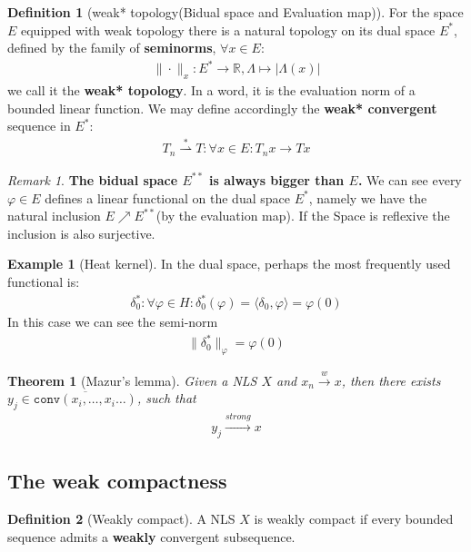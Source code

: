 \documentclass[a4paper,11pt,fleqn]{book}
\newtheorem{theorem}{Theorem}[section]
\theoremstyle{definition}
\newtheorem{definition}{Definition}[section]
\newtheorem*{example}{Example}
\theoremstyle{remark}
\newtheorem*{remark}{Remark}
\begin{document}
\begin{definition}[weak* topology(Bidual space and Evaluation map)]
For the space $E$ equipped with weak topology there is a natural topology on its dual space $E^*$, defined by the family of \textbf{seminorms}, $\forall x \in E$:
\begin{align*}
	  \| \cdot\|_x: E^* \rightarrow \mathbb{R},\Lambda \mapsto |\Lambda(x)| 
\end{align*}
we call it the \textbf{weak* topology}. In a word, it is the evaluation norm of a bounded linear function. We may define accordingly the \textbf{weak* convergent} sequence in $E^*$:
\begin{align*}
	T_n \overset{*}{\rightharpoonup} T: \forall x \in E: T_nx \rightarrow Tx
\end{align*}
\end{definition}
\begin{remark}
\textbf{The bidual space $E^{**}$ is always bigger than $E$.} We can see every $\varphi \in E$ defines a linear functional on the dual space $E^*$, namely we have the natural inclusion $E \nearrow E^{**}$(by the evaluation map). If the Space is reflexive the inclusion is also surjective.		
\end{remark}


\begin{example}[Heat kernel]	
In the dual space, perhaps the most frequently used functional is:
\begin{align*}
	\delta_0^* : \forall \varphi \in H: \delta_0^*(\varphi) =  \langle \delta_0, \varphi \rangle = \varphi(0)
\end{align*}
In this case we can see the semi-norm 
\begin{align*}
	\|\delta_0^*\|_{\varphi} = \varphi(0)
\end{align*}
\end{example}

\begin{theorem}[Mazur's lemma]
	Given a NLS $X$ and $x_n \overset{w}{\rightarrow} x$, then there exists $y_j \in \overline{\texttt{conv}(x_i, \dots, x_i \dots)}$, such that 
	\begin{align*}
		y_j \overset{strong}{\rightarrow} x
	\end{align*}
\end{theorem}

\subsection{The weak compactness}
\begin{definition}[Weakly compact]
	A NLS $X$ is weakly compact if every bounded sequence admits a \textbf{weakly} convergent subsequence.
\end{definition}
\end{document}
